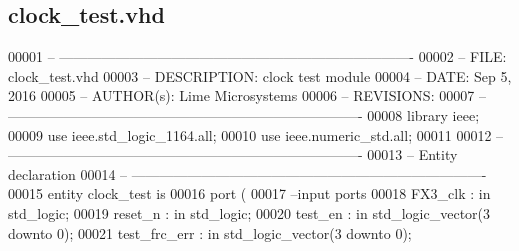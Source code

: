 \subsection{clock\+\_\+test.\+vhd}
\label{clock__test_8vhd_source}

\begin{DoxyCode}
00001 \textcolor{keyword}{-- ---------------------------------------------------------------------------- }
00002 \textcolor{keyword}{-- FILE:    clock\_test.vhd}
00003 \textcolor{keyword}{-- DESCRIPTION: clock test module}
00004 \textcolor{keyword}{-- DATE:    Sep 5, 2016}
00005 \textcolor{keyword}{-- AUTHOR(s):   Lime Microsystems}
00006 \textcolor{keyword}{-- REVISIONS:}
00007 \textcolor{keyword}{-- ---------------------------------------------------------------------------- }
00008 \textcolor{vhdlkeyword}{library }\textcolor{keywordflow}{ieee};
00009 \textcolor{vhdlkeyword}{use }ieee.std\_logic\_1164.\textcolor{keywordflow}{all};
00010 \textcolor{vhdlkeyword}{use }ieee.numeric\_std.\textcolor{keywordflow}{all};
00011 
00012 \textcolor{keyword}{-- ----------------------------------------------------------------------------}
00013 \textcolor{keyword}{-- Entity declaration}
00014 \textcolor{keyword}{-- ----------------------------------------------------------------------------}
00015 \textcolor{keywordflow}{entity }clock_test \textcolor{keywordflow}{is}
00016   \textcolor{keywordflow}{port} \textcolor{vhdlchar}{(}
00017 \textcolor{keyword}{        --input ports }
00018         \textcolor{vhdlchar}{FX3_clk}             \textcolor{vhdlchar}{:} \textcolor{keywordflow}{in} \textcolor{comment}{std\_logic};
00019         \textcolor{vhdlchar}{reset_n}             \textcolor{vhdlchar}{:} \textcolor{keywordflow}{in} \textcolor{comment}{std\_logic};
00020           \textcolor{vhdlchar}{test_en}               \textcolor{vhdlchar}{:} \textcolor{keywordflow}{in} \textcolor{comment}{std\_logic\_vector}\textcolor{vhdlchar}{(}\textcolor{vhdllogic}{}\textcolor{vhdllogic}{3} \textcolor{keywordflow}{downto} \textcolor{vhdllogic}{}\textcolor{vhdllogic}{0}\textcolor{vhdlchar}{)};
00021           \textcolor{vhdlchar}{test_frc_err}          \textcolor{vhdlchar}{:} \textcolor{keywordflow}{in} \textcolor{comment}{std\_logic\_vector}\textcolor{vhdlchar}{(}\textcolor{vhdllogic}{}\textcolor{vhdllogic}{3} \textcolor{keywordflow}{downto} \textcolor{vhdllogic}{}\textcolor{vhdllogic}{0}\textcolor{vhdlchar}{)};

\end{DoxyCode}
